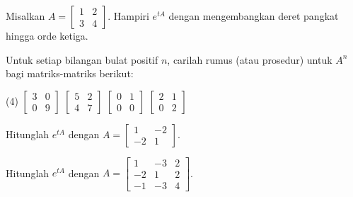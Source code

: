 \begin{exercise}
Misalkan $A = \left[ \begin{smallmatrix}
1 & 2 \\
3 & 4 
\end{smallmatrix} \right]$.
Hampiri $e^{tA}$ dengan mengembangkan deret pangkat
hingga orde ketiga.
\end{exercise}

\begin{exercise}
Untuk setiap bilangan bulat positif $n$,
carilah rumus (atau prosedur) untuk $A^n$ bagi matriks-matriks berikut:
\begin{tasks}(4)
\task
$
\begin{bmatrix}
3 & 0 \\ 0 & 9
\end{bmatrix}
$
\task
$
\begin{bmatrix}
5 & 2 \\ 4 & 7
\end{bmatrix}
$
\task
$
\begin{bmatrix}
0 & 1 \\ 0 & 0
\end{bmatrix}
$
\task
$
\begin{bmatrix}
2 & 1 \\ 0 & 2
\end{bmatrix}
$
\end{tasks}
\end{exercise}

\setcounter{exercise}{100}

\begin{exercise}
Hitunglah
$e^{tA}$ dengan
$A=\left[ \begin{smallmatrix}
1 & -2 \\
-2 & 1 
\end{smallmatrix}\right]$.
\end{exercise}

\begin{exercise}
Hitunglah
$e^{tA}$ dengan
$A=\left[ \begin{smallmatrix}
1 & -3 & 2 \\
-2 & 1 & 2 \\
-1 & -3 & 4
\end{smallmatrix}\right]$.
\end{exercise}


